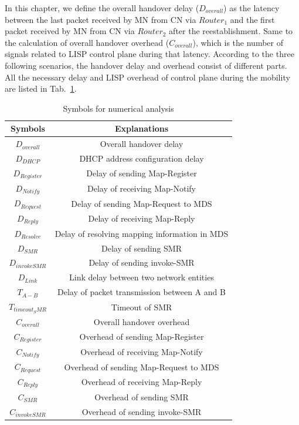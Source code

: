 In this chapter, we define the overall handover delay ($D_{overall}$) as the latency between the last packet received by MN from CN via $Router_1$ and the first packet received by MN from CN via $Router_2$ after the reestablishment. Same to the calculation of overall handover overhead ($C_{overall}$), which is the number of signals related to LISP control plane during that latency. According to the three following scenarios, the handover delay and overhead consist of different parts. All the necessary delay and LISP overhead of control plane during the mobility are listed in Tab.~\ref{Symbols_numerical_analysis}.
\begin{table}[!tb]
	\centering
	\caption{Symbols for numerical analysis}
	\label{Symbols_numerical_analysis}{
		\begin{tabular}{@{}|c|c|@{}}
			\hline\hline
			Symbols & Explanations   \\ \hline
			$D_{overall}$ & Overall handover delay	\\  \hline    
			$D_{DHCP}$ &  DHCP address configuration delay \\  \hline    
			$D_{Register}$ &  Delay of sending Map-Register      	\\  \hline
			$D_{Notify}$ &  Delay of receiving Map-Notify      	\\  \hline           
			$D_{Request}$ &  Delay of sending Map-Request to MDS      	\\  \hline   
			$D_{Reply}$ &  Delay of receiving Map-Reply      	\\  \hline      
			$D_{Resolve}$ &  Delay of resolving mapping information in MDS      	\\  \hline               
			$D_{SMR}$ &  Delay of sending SMR       	\\  \hline 
			$D_{invokeSMR}$ &  Delay of sending invoke-SMR \\  \hline 
			$D_{Link}$ &  Link delay between two network entities \\  \hline 
			$T_{A-B}$ &  Delay of packet transmission between A and B     	\\  \hline
			$T_{timeout_SMR}$ &  Timeout of SMR      	\\  \hline
			$C_{overall}$ &  Overall handover overhead \\  \hline    
			$C_{Register}$ &  Overhead of sending Map-Register      	\\  \hline
			$C_{Notify}$ &  Overhead of receiving Map-Notify      	\\  \hline           
			$C_{Request}$ &  Overhead of sending Map-Request to MDS      	\\  \hline   
			$C_{Reply}$ &  Overhead of receiving Map-Reply      	\\  \hline      
			$C_{SMR}$ &  Overhead of sending SMR       	\\  \hline 
			$C_{invokeSMR}$ &  Overhead of sending invoke-SMR \\  \hline  \hline    
		\end{tabular}
	}
\end{table}
